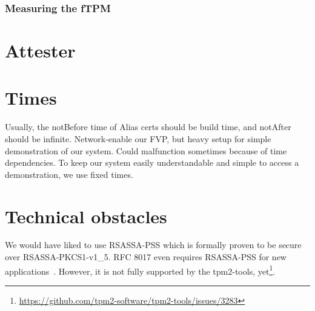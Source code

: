 \subsubsection{Measuring the fTPM}

\section{Attester}

\section{Times}

Usually, the notBefore time of Alias certs should be build time, and notAfter should be infinite.
Network-enable our FVP, but heavy setup for simple demonstration of our system.
Could malfunction sometimes because of time dependencies.
To keep our system easily understandable and simple to access a demonstration, we use fixed times.


\section{Technical obstacles}

We would have liked to use RSASSA-PSS which is formally proven to be secure over RSASSA-PKCS1-v1\_5.
RFC 8017 even requires RSASSA-PSS for new applications~\cite{Moriarty2016}.
However, it is not fully supported by the tpm2-tools, yet\footnote{\url{https://github.com/tpm2-software/tpm2-tools/issues/3283}}.
